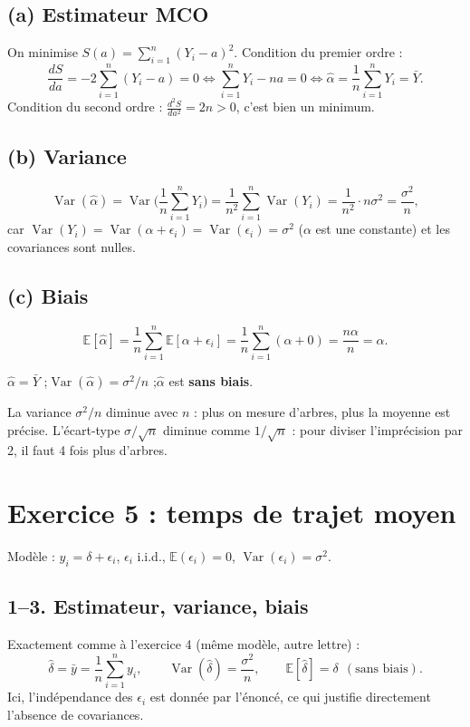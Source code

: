 \documentclass[11pt,a4paper]{article}
\newcommand{\E}{\mathbb{E}}\newcommand{\Var}{\operatorname{Var}}\newcommand{\Cov}{\operatorname{Cov}}
\newcommand{\sumi}{\sum_{i=1}^{n}}
\begin{document}
\subsection*{(a) Estimateur MCO}
On minimise $S(a)=\sumi(Y_i-a)^2$. Condition du premier ordre :
\[
\frac{dS}{da}=-2\sumi(Y_i-a)=0\iff\sumi Y_i-na=0\iff \hat\alpha=\frac1n\sumi Y_i=\bar Y .
\]
Condition du second ordre : $\frac{d^2S}{da^2}=2n>0$, c'est bien un minimum.

\subsection*{(b) Variance}
\[
\Var(\hat\alpha)=\Var\Big(\frac1n\sumi Y_i\Big)=\frac1{n^2}\sumi\Var(Y_i)=\frac{1}{n^2}\cdot n\sigma^2=\frac{\sigma^2}{n},
\]
car $\Var(Y_i)=\Var(\alpha+\epsilon_i)=\Var(\epsilon_i)=\sigma^2$ ($\alpha$ est une constante) et les covariances sont nulles.

\subsection*{(c) Biais}
\[
\E[\hat\alpha]=\frac1n\sumi\E[\alpha+\epsilon_i]=\frac1n\sumi(\alpha+0)=\frac{n\alpha}{n}=\alpha .
\]

\begin{reponse}
$\hat\alpha=\bar Y$ \quad;\quad $\Var(\hat\alpha)=\sigma^2/n$ \quad;\quad $\hat\alpha$ est \textbf{sans biais}.
\end{reponse}

\begin{intuition}
La variance $\sigma^2/n$ diminue avec $n$ : plus on mesure d'arbres, plus la moyenne est précise. L'écart-type $\sigma/\sqrt n$ diminue comme $1/\sqrt n$ : pour diviser l'imprécision par 2, il faut 4 fois plus d'arbres.
\end{intuition}

\section{Exercice 5 : temps de trajet moyen}

Modèle : $y_i=\delta+\epsilon_i$, $\epsilon_i$ i.i.d., $\E(\epsilon_i)=0$, $\Var(\epsilon_i)=\sigma^2$.

\subsection*{1--3. Estimateur, variance, biais}
Exactement comme à l'exercice 4 (même modèle, autre lettre) :
\[
\hat\delta=\bar y=\frac1n\sumi y_i,\qquad \Var(\hat\delta)=\frac{\sigma^2}{n},\qquad \E[\hat\delta]=\delta\ \ (\text{sans biais}).
\]
Ici, l'indépendance des $\epsilon_i$ est donnée par l'énoncé, ce qui justifie directement l'absence de covariances.
\end{document}
